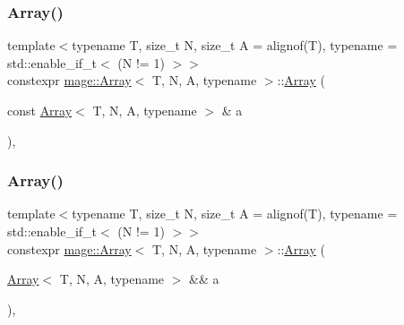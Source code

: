 \mbox{\label{structmage_1_1_array_a8dc58948e15554f715b280a72140a1f4}} 
\subsubsection{\texorpdfstring{Array()}{Array()}\hspace{0.1cm}{\footnotesize\ttfamily [8/10]}}
{\footnotesize\ttfamily template$<$typename T, size\+\_\+t N, size\+\_\+t A = alignof(\+T), typename  = std\+::enable\+\_\+if\+\_\+t$<$ (\+N != 1) $>$$>$ \\
constexpr \mbox{\hyperlink{structmage_1_1_array}{mage\+::\+Array}}$<$ T, N, A, typename $>$\+::\mbox{\hyperlink{structmage_1_1_array}{Array}} (\begin{DoxyParamCaption}\item[{const \mbox{\hyperlink{structmage_1_1_array}{Array}}$<$ T, N, A, typename $>$ \&}]{a }\end{DoxyParamCaption})\hspace{0.3cm}{\ttfamily [default]}, {\ttfamily [noexcept]}}

\mbox{\label{structmage_1_1_array_a4cf0fb395b42d53b6e59868739dc9613}} 
\subsubsection{\texorpdfstring{Array()}{Array()}\hspace{0.1cm}{\footnotesize\ttfamily [9/10]}}
{\footnotesize\ttfamily template$<$typename T, size\+\_\+t N, size\+\_\+t A = alignof(\+T), typename  = std\+::enable\+\_\+if\+\_\+t$<$ (\+N != 1) $>$$>$ \\
constexpr \mbox{\hyperlink{structmage_1_1_array}{mage\+::\+Array}}$<$ T, N, A, typename $>$\+::\mbox{\hyperlink{structmage_1_1_array}{Array}} (\begin{DoxyParamCaption}\item[{\mbox{\hyperlink{structmage_1_1_array}{Array}}$<$ T, N, A, typename $>$ \&\&}]{a }\end{DoxyParamCaption})\hspace{0.3cm}{\ttfamily [default]}, {\ttfamily [noexcept]}}

\mbox{\label{structmage_1_1_array_a950b26208c3546704f42e92c312a93ed}} 
